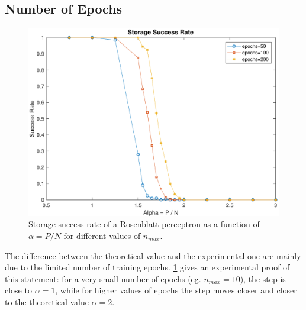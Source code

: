 \subsection{Number of Epochs}
\label{subsec:epochs}
\begin{figure}[t]
	\centering
	\includegraphics[width=\columnwidth]{figures/multiple_epochs}
    \caption{Storage success rate of a Rosenblatt perceptron as a function of $\alpha = P / N$ for different values of $n_{max}$.}
	\label{fig:multiple_epochs}
\end{figure}

The difference between the theoretical value and the experimental one are mainly due to the limited number of training epochs.
\cref{fig:multiple_epochs} gives an experimental proof of this statement:
for a very small number of epochs (eg. $n_{max} = 10$), the step is close to $\alpha = 1$, while for higher values of epochs the step moves closer and closer to the theoretical value $\alpha = 2$.

